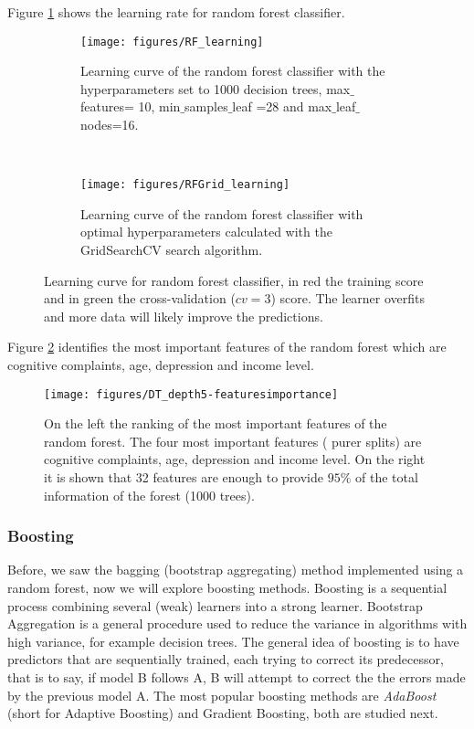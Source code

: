 \documentclass[11pt]{article}
\theoremstyle{definition}
\theoremstyle{remark}
\begin{document}
Figure \ref{fig:rf_learning} shows the learning rate for random forest classifier. 
\begin{figure}[H]
    \centering
    \begin{subfigure}[t]{0.45\textwidth}
        \centering
        \texttt{[image: figures/RF\_learning]}
        \caption{Learning curve of the random forest classifier with the hyperparameters set to 1000 decision trees, max$\_$features= 10, min$\_$samples$\_$leaf =28 and max$\_$leaf$\_$nodes=16.}
    \end{subfigure}
    ~ 
    \begin{subfigure}[t]{0.45\textwidth}
        \centering
        \texttt{[image: figures/RFGrid\_learning]}
        \caption{Learning curve of the random forest classifier with optimal hyperparameters calculated with the GridSearchCV search algorithm.}
    \end{subfigure}%
    
    \caption{Learning curve for random forest classifier, in red the training score and in green the cross-validation ($cv=3$) score. The learner overfits and more data will likely improve the predictions.} \label{fig:rf_learning}
\end{figure}

Figure \ref{fig:rf-features} identifies the most important features of the random forest which are cognitive complaints, age, depression and income level.
\begin{figure}[H]
        \centering
        \texttt{[image: figures/DT\_depth5-featuresimportance]}
        \caption{On the left the ranking of the most important features of the random forest. The four most important features ( purer splits) are cognitive complaints, age, depression and income level. On the right it is shown that 32 features are enough to provide $95\%$ of the total information of the forest (1000 trees).   
        } \label{fig:rf-features}
\end{figure}

\subsubsection{Boosting}
\label{sse:resgradboosting}

Before, we saw the bagging (bootstrap aggregating) method implemented using a random forest, now we will explore boosting methods.
Boosting is a sequential process combining several (weak) learners into a strong learner. Bootstrap Aggregation is a general procedure used to reduce the variance in algorithms with high variance, for example decision trees. The general idea of boosting is to have predictors that are sequentially trained, each trying to correct its predecessor, that is to say, if model B follows A, B will attempt to correct the the errors made by the previous model A.
The most popular boosting methods are \emph{AdaBoost} (short for Adaptive Boosting) and Gradient Boosting, both are studied next.
\end{document}
